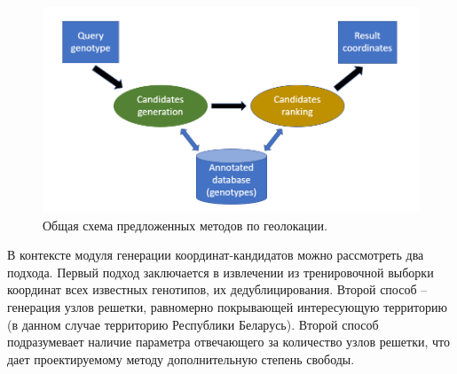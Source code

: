 \begin{figure}[h]
\begin{center}
\includegraphics[width=14cm]{images/geoloc_over.png}
\end{center}
  \caption{Общая схема предложенных методов по геолокации.}
  \label{image:geoloc_over}
\end{figure}

В контексте модуля генерации координат-кандидатов можно рассмотреть два подхода. Первый подход
заключается в извлечении из тренировочной выборки координат всех известных генотипов,
их дедублицирования. Второй способ -- генерация узлов решетки, равномерно покрывающей
интересующую территорию (в данном случае территорию Республики Беларусь). Второй способ подразумевает
наличие параметра отвечающего за количество узлов решетки, что дает проектируемому методу
дополнительную степень свободы.

